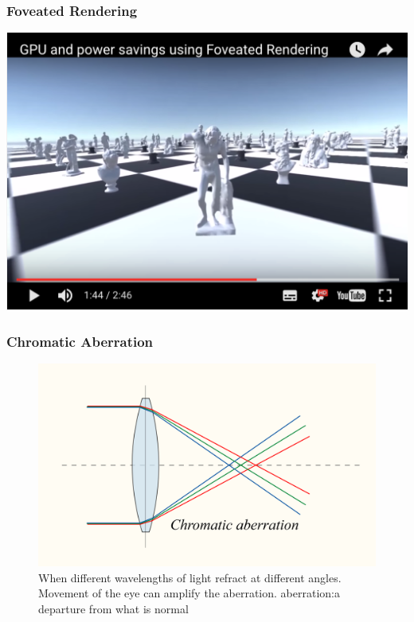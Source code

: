 \begin{frame}
	\frametitle{Foveated Rendering}
	\begin{center}
		\href{https://www.youtube.com/watch?v=6q3w0fiD0zg}{ \includegraphics[scale=.4]{assets/foveated-rendering}  }
	\end{center}
\end{frame}

\begin{frame}
	\frametitle{Chromatic Aberration }
	
	\begin{figure}
		\includegraphics[scale=.1]{assets/aberration} 
		\caption{When different wavelengths of light refract at different angles. Movement of the eye can amplify the aberration. \tiny{aberration:a departure from what is normal}}
	\end{figure}
\end{frame}

